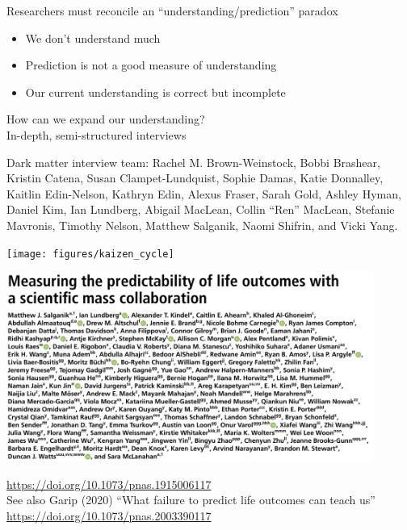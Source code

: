 \documentclass[aspectratio=169]{beamer}
\begin{document}
\begin{frame}

Researchers must reconcile an ``understanding/prediction'' paradox \pause
\begin{itemize}
\item We don't understand much \pause
\item Prediction is not a good measure of understanding \pause
\item Our current understanding is correct but incomplete
\end{itemize}

\end{frame}
\begin{frame}

\begin{center}
{\Large How can we expand our understanding?}\\ 
\vspace{0.5in}
\pause
{\Large In-depth, semi-structured interviews}
\end{center}

\vfill
Dark matter interview team: Rachel M. Brown-Weinstock, Bobbi Brashear, Kristin Catena, Susan Clampet-Lundquist, Sophie Damas, Katie Donnalley, Kaitlin Edin-Nelson, Kathryn Edin, Alexus Fraser, Sarah Gold, Ashley Hyman, Daniel Kim, Ian Lundberg, Abigail MacLean, Collin ``Ren'' MacLean, Stefanie Mavronis, Timothy Nelson, Matthew Salganik, Naomi Shifrin, and Vicki Yang.
\end{frame}
\begin{frame}

\begin{center}
\texttt{[image: figures/kaizen\_cycle]}
\end{center}

\end{frame}
\begin{frame}

\begin{center}
\includegraphics[width=0.9\textwidth]{figures/salganik_measuring_2020_title_authors}
\end{center}

\vfill
\url{https://doi.org/10.1073/pnas.1915006117}\\
See also Garip (2020) ``What failure to predict life outcomes can teach us'' \url{https://doi.org/10.1073/pnas.2003390117}

\end{frame}
\end{document}
